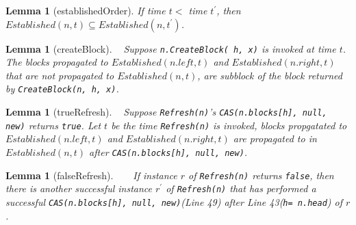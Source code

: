 \documentclass[10pt]{article}
\renewcommand{\tt}[1]{\texttt{#1}}
\newtheorem{lemma}[theorem]{Lemma}
\theoremstyle{definition}
\begin{document}
\begin{lemma}[establishedOrder]\label{lem::establishedOrder}
  If  time $t<$ time $t^\prime$, then $Established(n, t)\subseteq Established(n, t^\prime)$.
\end{lemma}

\begin{lemma}[createBlock] \label{lem::createBlock}
  Suppose \tt{n.CreateBlock( h, x)} is invoked at time $t$. The blocks propagated to $Established(n.left, t)$ and $Established(n.right, t)$ that are not propagated to $Established(n, t)$, are subblock of the block returned by \tt{CreateBlock(n, h, x)}.
\end{lemma}

\begin{lemma}[trueRefresh] \label{lem::trueRefresh}
  Suppose \tt{Refresh(n)}'s \tt{CAS(n.blocks[h], null, new)} returns \tt{true}. Let $t$ be the time \tt{Refresh(n)} is invoked, blocks propgatated to $Established(n.left, t)$ and $Established(n.right, t)$ are propagated to in $Established(n, t)$ after \tt{CAS(n.blocks[h], null, new)}.
\end{lemma}

\begin{lemma}[falseRefresh] \label{lem:falseRefresh}
    If instance $r$ of \tt{Refresh(n)} returns \tt{false}, then there is another successful instance $r^\prime$ of \tt{Refresh(n)} that has performed a successful \tt{CAS(n.blocks[h], null, new)}(Line 49) after Line 43(\tt{h= n.head}) of $r$.
\end{lemma}
\end{document}
